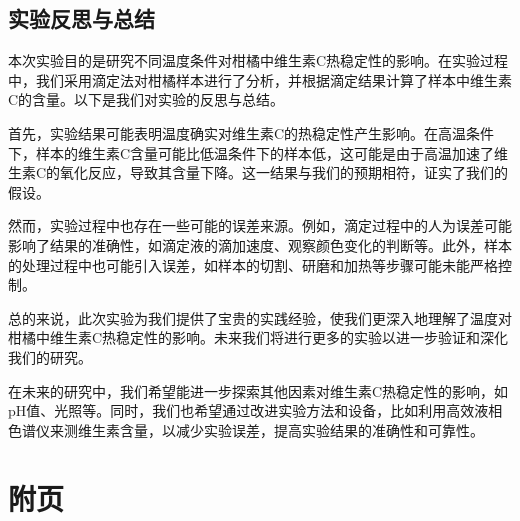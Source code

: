 \documentclass[12pt,hyperref,a4paper,UTF8]{ctexart}
\begin{document}
\subsection{实验反思与总结}
本次实验目的是研究不同温度条件对柑橘中维生素C热稳定性的影响。在实验过程中，我们采用滴定法对柑橘样本进行了分析，并根据滴定结果计算了样本中维生素C的含量。以下是我们对实验的反思与总结。

首先，实验结果可能表明温度确实对维生素C的热稳定性产生影响。在高温条件下，样本的维生素C含量可能比低温条件下的样本低，这可能是由于高温加速了维生素C的氧化反应，导致其含量下降。这一结果与我们的预期相符，证实了我们的假设。

然而，实验过程中也存在一些可能的误差来源。例如，滴定过程中的人为误差可能影响了结果的准确性，如滴定液的滴加速度、观察颜色变化的判断等。此外，样本的处理过程中也可能引入误差，如样本的切割、研磨和加热等步骤可能未能严格控制。

总的来说，此次实验为我们提供了宝贵的实践经验，使我们更深入地理解了温度对柑橘中维生素C热稳定性的影响。未来我们将进行更多的实验以进一步验证和深化我们的研究。

在未来的研究中，我们希望能进一步探索其他因素对维生素C热稳定性的影响，如pH值、光照等。同时，我们也希望通过改进实验方法和设备，比如利用高效液相色谱仪来测维生素含量，以减少实验误差，提高实验结果的准确性和可靠性。

\newpage
\section{附页}
\end{document}
